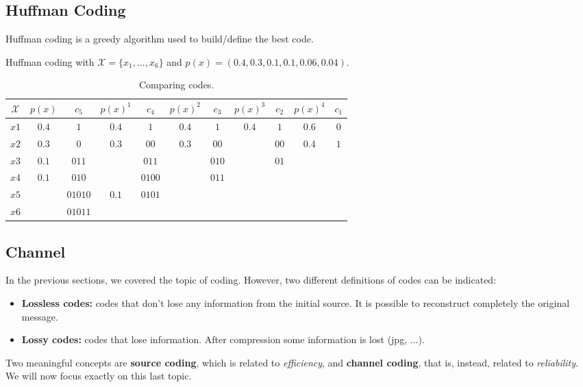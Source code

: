 \subsection{Huffman Coding}
Huffman coding is a greedy algorithm used to build/define the best code. 
\begin{exmp} Huffman coding with $\mathcal{X} = \{x_1, \dots, x_6\}$ and $p(x) = (0.4,0.3,0.1,0.1,0.06,0.04)$.
	
	\begin{table}[H]
		\centering
		\begin{tabular}{| c | c | c | c | c | c | c | c | c | c | c |}
			\hline
			$\mathcal{X}$ & $p(x)$ & $c_5$ & $p(x)^1$ & $c_4$ & $p(x)^2$ & $c_3$ & $p(x)^3$& $c_2$ & $p(x)^4$&$c_1$ \\\hline
			$x1$ & $0.4$ & $1$ & $0.4$ & $1$ & $0.4$ & $1$ & $0.4$& $1$ & $0.6$& $0$ \\
			$x2$ & $0.3$ & $0$ & $0.3$ & $00$ & $0.3$ & $00$ & {\color{red}{*$0.3$}}& $00$ & $0.4$& $1$ \\
			$x3$ & $0.1$ & $011$ & {\color{red}{*$0.1$}} & $011$ & {\color{red}{*$0.2$}} & $010$ & {\color{red}{*$0.3$}}& $01$ & &  \\
			$x4$ & $0.1$ & $010$ & {\color{red}{*$0.1$}} & $0100$ & {\color{red}{*$0.1$}} & $011$ & & & & \\
			$x5$ & {\color{red}{*$0.06$}} & $01010$ & $0.1$ & $0101$ & & & & & &\\
			$x6$ & {\color{red}{*$0.04$}} & $01011$ &  &  &  & & & & & \\
			\hline
		\end{tabular}
		\caption{Comparing codes.}
	\end{table}
\end{exmp}

\subsection{Channel}
In the previous sections, we covered the topic of coding. However, two different definitions of codes can be indicated:
\begin{itemize}
	\item \textbf{Lossless codes:} codes that don't lose any information from the initial source. It is possible to reconstruct completely the original message.
	\item \textbf{Lossy codes:} codes that lose information. After compression some information is lost (jpg, $\dots$).
\end{itemize}
Two meaningful concepts are \textbf{source coding}, which is related to \textit{efficiency}, and \textbf{channel coding}, that is, instead, related to \textit{reliability}. We will now focus exactly on this last topic. 

